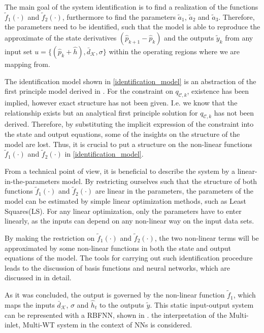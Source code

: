 The main goal of the system identification is to find a realization of the functions $\tilde{f}_1(\cdot)$ and $\tilde{f}_2(\cdot)$, furthermore to find the parameters $\tilde{a}_1$, $\tilde{a}_2$ and $\tilde{a}_3$. Therefore, the parameters need to be identified, such that the model is able to reproduce the approximate of the state derivatives $(\hat{p}_{k+1} - \hat{p}_k)$ and the outputs $\tilde{y}_k$ from any input set $u = \{(\hat{p}_k + \hat{h}), \bar{d}_{\mathcal{K}}, \sigma \}$ within the operating regions where we are mapping from.

The identification model shown in \eqref{identification_model} is an abstraction of the first principle model derived in . For the constraint on $q_{\mathcal{C},k}$, existence has been implied, however exact structure has not been given. I.e. we know that the relationship exists but an analytical first principle solution for $q_{\mathcal{C},k}$ has not been derived. Therefore, by substituting the implicit expression of the constraint into the state and output equations, some of the insights on the structure of the model are lost. Thus, it is crucial to put a structure on the non-linear functions $\tilde{f}_1(\cdot)$ and $\tilde{f}_2(\cdot)$ in \eqref{identification_model}. 

From a technical point of view, it is beneficial to describe the system by a linear-in-the-parameters model. By restricting ourselves such that the structure of both functions $\tilde{f}_1(\cdot)$ and $\tilde{f}_2(\cdot)$ are linear in the parameters, the parameters of the model can be estimated by simple linear optimization methods, such as Least Squares(LS). For any linear optimization, only the parameters have to enter linearly, as the inputs can depend on any non-linear way on the input data sets. 

By making the restriction on $\tilde{f}_1(\cdot)$ and $\tilde{f}_2(\cdot)$, the two non-linear terms will be approximated by some non-linear functions in both the state and output equations of the model. The tools for carrying out such identification procedure leads to the discussion of basis functions and neural networks, which are discussed in  in detail. 

\newpage

As it was concluded, the output is governed by the non-linear function $\tilde{f}_1$, which maps the inputs $\bar{d}_{\mathcal{K}}$, $\sigma$ and $\hat{h}_t $ to the outputs $\tilde{y}$. This static input-output system can be represented with a RBFNN, shown in .
the interpretation of the Multi-inlet, Multi-WT system in the context of NNs is considered. 

